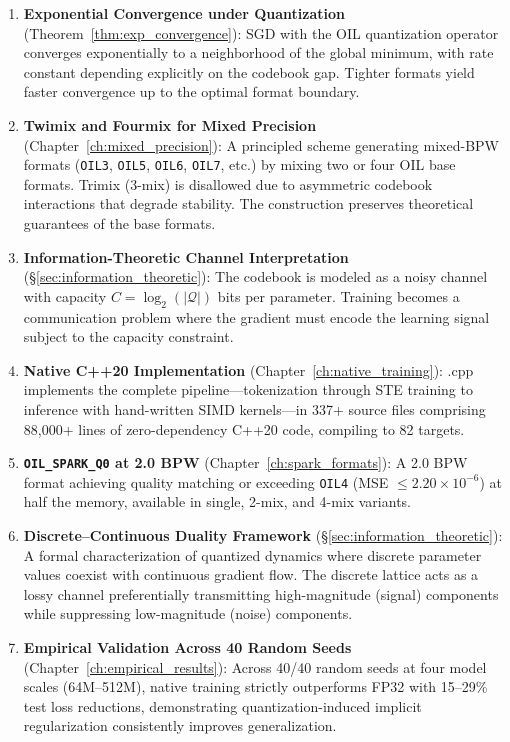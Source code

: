 \begin{enumerate}
    \item \textbf{Exponential Convergence under Quantization} (Theorem~\ref{thm:exp_convergence}): SGD with the OIL quantization operator converges exponentially to a neighborhood of the global minimum, with rate constant depending explicitly on the codebook gap. Tighter formats yield faster convergence up to the optimal format boundary.

    \item \textbf{Twimix and Fourmix for Mixed Precision} (Chapter~\ref{ch:mixed_precision}): A principled scheme generating mixed-BPW formats (\texttt{OIL3}, \texttt{OIL5}, \texttt{OIL6}, \texttt{OIL7}, etc.) by mixing two or four OIL base formats. Trimix (3-mix) is disallowed due to asymmetric codebook interactions that degrade stability. The construction preserves theoretical guarantees of the base formats.

    \item \textbf{Information-Theoretic Channel Interpretation} (\S\ref{sec:information_theoretic}): The codebook is modeled as a noisy channel with capacity $C = \log_2(|\mathcal{Q}|)$ bits per parameter. Training becomes a communication problem where the gradient must encode the learning signal subject to the capacity constraint.

    \item \textbf{Native C++20 Implementation} (Chapter~\ref{ch:native_training}): \MYTHOS{}.cpp implements the complete pipeline---tokenization through STE training to inference with hand-written SIMD kernels---in 337+ source files comprising 88,000+ lines of zero-dependency C++20 code, compiling to 82 targets.

    \item \textbf{\texttt{OIL\_SPARK\_Q0} at 2.0 BPW} (Chapter~\ref{ch:spark_formats}): A 2.0 BPW format achieving quality matching or exceeding \texttt{OIL4} (MSE $\leq 2.20 \times 10^{-6}$) at half the memory, available in single, 2-mix, and 4-mix variants.

    \item \textbf{Discrete--Continuous Duality Framework} (\S\ref{sec:information_theoretic}): A formal characterization of quantized dynamics where discrete parameter values coexist with continuous gradient flow. The discrete lattice acts as a lossy channel preferentially transmitting high-magnitude (signal) components while suppressing low-magnitude (noise) components.

    \item \textbf{Empirical Validation Across 40 Random Seeds} (Chapter~\ref{ch:empirical_results}): Across 40/40 random seeds at four model scales (64M--512M), native \OIL{} training strictly outperforms FP32 with 15--29\% test loss reductions, demonstrating quantization-induced implicit regularization consistently improves generalization.


\end{enumerate}
